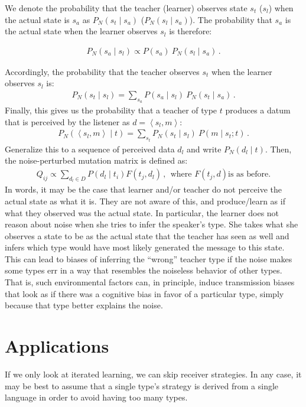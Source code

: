 \documentclass[11pt]{article}
\newcommand{\tuple}[1]{\ensuremath{\left\langle #1 \right\rangle}}
\begin{document}
We denote the probability that the teacher (learner) observes state $s_t$ ($s_l$) when the actual state is $s_a$ as $P_N(s_t \mid s_a)$ ($P_N(s_l \mid s_a)$). The probability that $s_a$ is the actual state when the learner observes $s_l$ is therefore:

\begin{align*}
  P_N(s_a \mid s_l) \propto P(s_a) \ P_N(s_l \mid s_a)\,.
\end{align*}

Accordingly, the probability that the teacher observes $s_t$ when the learner observes $s_l$ is:
\begin{align*}
  P_N(s_t \mid s_l) = \sum_{s_a} P(s_a \mid s_l) \ P_N(s_t \mid s_a)\,.
\end{align*}
Finally, this gives us the probability that a teacher of type $t$ produces a datum that is
perceived by the listener as $d = \tuple{s_l, m}$:
\begin{align*}
  P_N(\tuple{s_l, m} \mid t) = \sum_{s_t} P_N(s_t \mid s_l) \ P(m \mid s_t; t)\,.
\end{align*}
Generalize this to a sequence of perceived data $d_l$ and write $P_N(d_l \mid t)$. Then, the noise-perturbed mutation matrix is defined as:
\begin{align*}
  Q_{ij}  \propto \sum_{d_l \in D} P(d_l \mid t_i) F(t_j,d_l) \,, \ \  \text{where $F(t_j,d)$
    is as before.}
\end{align*}
In words, it may be the case that learner and/or teacher do not perceive the actual state as what it is. They are not aware of this, and produce/learn as if what they observed was the actual state. In particular, the learner does not reason about noise when she tries to infer the speaker's type. She takes what she observes a state to be as the actual state that the teacher has seen as well and infers which type would have most likely generated the message to this state. This can lead to biases of inferring the ``wrong'' teacher type if the noise makes some types err in a way that resembles the noiseless behavior of other types. That is, such environmental factors can, in principle, induce transmission biases that look as if there was a cognitive bias in favor of a particular type, simply because that type better explains the noise.

\section{Applications}
If we only look at iterated learning, we can skip receiver strategies. In any case, it may be best to assume that a single type's strategy is derived from a single language in order to avoid having too many types. 
\end{document}
